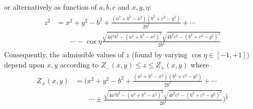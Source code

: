 \documentclass[notitlepage, 10pt]{article}
\begin{document}
or alternatively as function of $a,b,c$ and $x,y,\eta$:
\begin{align}
    \begin{split}
        z^2
        &= x^2 + y^2 - b^2 + \frac{(a^2+b^2-x^2)(b^2+c^2-y^2)}{2b^2} + \cdots \\
        &\qquad \cdots - \cos \eta \frac{\sqrt{4a^2b^2-(a^2+b^2-x^2)^2}\sqrt{4b^2c^2-(b^2+c^2-y^2)^2}}{2b^2}
    \end{split}
\end{align}
Consequently, the admissible values of $z$ (found by varying $\cos \eta \in [-1, +1]$) depend upon $x,y$ according to $Z_{-}(x,y) \leq z \leq Z_{+}(x,y)$ where
\begin{align}
    \begin{split}
        Z_{\pm}(x,y) 
        &= \bigg(x^2 + y^2 - b^2 + \frac{(a^2+b^2-x^2)(b^2+c^2-y^2)}{2b^2} +\cdots\\&\qquad\cdots\pm \frac{\sqrt{4a^2b^2-(a^2+b^2-x^2)^2}\sqrt{4b^2c^2-(b^2+c^2-y^2)^2}}{2b^2}\bigg)^{\frac{1}{2}}
    \end{split}
\end{align}
\end{document}
